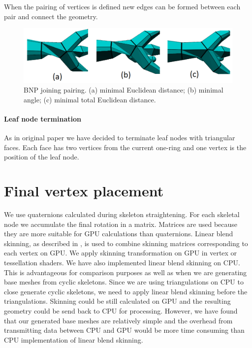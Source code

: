 When the pairing of vertices is defined new edges can be formed between each pair and connect the geometry.

\begin{figure}[h]
    \centering
    \includegraphics[width=\textwidth]{images/join_pairing.png}
    \caption[BNP joining pairing]{BNP joining pairing. (a) minimal Euclidean distance; (b) minimal angle; (c) minimal total Euclidean distance.}
    \label{fig:join_pairing_ilu}
\end{figure}

\paragraph{Leaf node termination}
As in original paper \cite{sqm} we have decided to terminate leaf nodes with triangular faces. Each face has two vertices from the current one-ring and one vertex is the position of the leaf node.

\section{Final vertex placement}\label{sec:fvp}
We use quaternions calculated during skeleton straightening.
For each skeletal node we accumulate the final rotation in a matrix.
Matrices are used because they are more suitable for GPU calculations than quaternions.
Linear blend skinning, as described in \cite{Kavan-07-SDQ}, is used to combine skinning matrices corresponding to each vertex on GPU.
We apply skinning transformation on GPU in vertex or tessellation shaders.
We have also implemented linear blend skinning on CPU.
This is advantageous for comparison purposes as well as when we are generating base meshes from cyclic skeletons.
Since we are using triangulations on CPU to close generate cyclic skeletons, we need to apply linear blend skinning before the triangulations.
Skinning could be still calculated on GPU and the resulting geometry could be send back to CPU for processing. However, we have found that our generated base meshes are relatively simple and the overhead from transmitting data between CPU and GPU would be more time consuming than CPU implementation of linear blend skinning.

